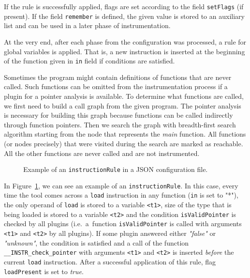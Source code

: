 If the rule is successfully applied, flags are set according to the field
\texttt{setFlags} (if present). If the field \texttt{remember} is defined, the
given value is stored to an auxiliary list and can be used in a later phase of
instrumentation.

At the very end, after each phase from the configuration was processed, a rule
for global variables is applied. That is, a new instruction is inserted at the
beginning of the function given in \texttt{in} field if conditions are
satisfied.

Sometimes the program might contain definitions of functions that are never
called. Such functions can be omitted from the instrumentation process if a
plugin for a pointer analysis is available. To determine what functions are
called, we first need to build a call graph from the given program. The pointer
analysis is necessary for building this graph because functions can be called
indirectly through function pointers. Then we search the graph with
breadth-first search algorithm starting from the node that represents the
\emph{main} function. All functions (or nodes precisely) that were visited
during the search are marked as reachable. All the other functions are never
called and are not instrumented.


\begin{figure}[h]

\caption{Example of an \texttt{instructionRule} in a JSON configuration file.}
\label{fig:json_example}
\end{figure}

In Figure~\ref{fig:json_example}, we can see an example of an
\texttt{instructionRule}. In this case, every time the tool comes across a
\texttt{load} instruction in any function (\texttt{in} is set to "*"), the only
operand of \texttt{load} is stored to a variable \texttt{<t1>}, size of the
type that is being loaded is stored to a variable \texttt{<t2>} and the condition
\texttt{isValidPointer} is checked by all plugins (i.e.~a~function
\texttt{isValidPointer} is called with arguments \texttt{<t1>} and
\texttt{<t2>} by all plugins). If some plugin answered either \emph{"false"} or
\emph{"unknown"}, the condition is satisfied and a call of the function
\texttt{\_\_INSTR\_check\_pointer} with arguments \texttt{<t1>} and
\texttt{<t2>} is inserted \emph{before} the current \texttt{load} instruction.
After a successful application of this rule, flag \texttt{loadPresent} is set
to \emph{true}.

